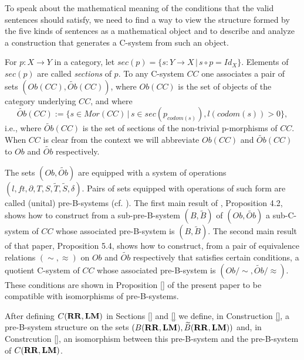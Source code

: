 \documentclass[12pt]{amsart}
\numberwithin{proposition}{subsection}
\newcommand{\llabel}[1]{\label{#1}}
\newcommand{\sr}{\rightarrow}
\newcommand{\wt}{\widetilde}
\newcommand{\RR}{{\bf RR}}
\newcommand{\LM}{{\bf LM}}
\begin{document}
To speak about the mathematical meaning of the conditions that the valid sentences should satisfy, we need to find a way to view the structure formed by the five kinds of sentences as a mathematical object and to describe and analyze a construction that generates a C-system from such an object.



For $p:X\sr Y$ in a category, let $sec(p)=\{s:Y\sr X\,|\,s\circ p=Id_X\}$. 
Elements of $sec(p)$ are called {\em sections} of $p$. To any C-system
$CC$ one associates a pair of sets $(Ob(CC),\wt{Ob}(CC))$, where $Ob(CC)$ is the
set of objects of the category underlying $CC$, and where
%
\begin{equation}
\llabel{2017.02.04.eq1}
\wt{Ob}(CC):=\{s\in Mor(CC)\,|\,s\in sec(p_{codom(s)}), l(codom(s))>0\},
\end{equation}%
%
i.e., where $\wt{Ob}(CC)$ is the set of sections of the non-trivial
p-morphisms of $CC$. When $CC$ is clear from the context we will abbreviate
$Ob(CC)$ and $\wt{Ob}(CC)$ to $Ob$ and $\wt{Ob}$ respectively.

The sets $(Ob,\wt{Ob})$ are equipped with a system of operations
$(l,ft,\partial,T,S,\wt{T},\wt{S},\delta)$. Pairs of sets equipped with
operations of such form are called (unital) pre-B-systems
(cf.{} \cite{Bsystemsnew}). The first main result of \cite{Csubsystems},
Proposition 4.2, shows how to construct from a sub-pre-B-system $(B,\wt{B})$ of
$(Ob,\wt{Ob})$ a sub-C-system of $CC$ whose associated pre-B-system is
$(B,\wt{B})$. The second main result of that paper, Proposition 5.4, shows how
to construct, from a pair of equivalence relations $(\sim,\approx)$ on $Ob$ and
$\wt{Ob}$ respectively that satisfies certain conditions, a quotient C-system
of $CC$ whose associated pre-B-system is $(Ob/{\sim},\wt{Ob}/\approx)$. These
conditions are shown in Proposition \ref{} of the present paper to be
compatible with isomorphisms of pre-B-systems.

After defining $C(\RR,\LM)$ in Sections \ref{} and \ref{}
we define, in Construction \ref{}, a pre-B-system structure on the sets
$(B(\RR,\LM),\wt{B}(\RR,\LM))$ and, in Constrcution \ref{}, an isomorphism
between this pre-B-system and the pre-B-system of $C(\RR,\LM)$.
\end{document}
